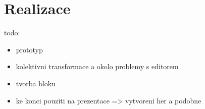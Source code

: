 \chapter{Realizace}

todo:

\begin{itemize}
    \item prototyp
    \item kolektivni transformace a okolo problemy s editorem
    \item tvorba bloku
    \item ke konci pouziti na prezentace => vytvoreni her a podobne
\end{itemize}